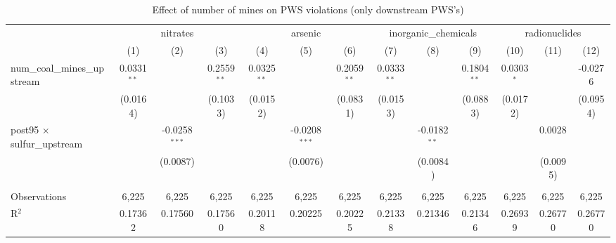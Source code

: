 
\begin{table}[htbp]
   \caption{\label{olsrf2sls_nummine_mine_vio_binary_1985to2005dwnstrm} Effect of number of mines on PWS violations (only downstream PWS's)}
   \bigskip
   \centering
   \begin{adjustbox}{width = \textwidth, center}
      \begin{tabular}{lcccccccccccc}
         \toprule
          & \multicolumn{3}{c}{nitrates} & \multicolumn{3}{c}{arsenic} & \multicolumn{3}{c}{inorganic\_chemicals} & \multicolumn{3}{c}{radionuclides}\\
                                                           & (1)           & (2)             & (3)           & (4)           & (5)             & (6)           & (7)           & (8)            & (9)           & (10)          & (11)                  & (12)\\  
         \midrule 
         num\_coal\_mines\_upstream                        & 0.0331$^{**}$ &                 & 0.2559$^{**}$ & 0.0325$^{**}$ &                 & 0.2059$^{**}$ & 0.0333$^{**}$ &                & 0.1804$^{**}$ & 0.0303$^{*}$  &                       & -0.0276\\   
                                                           & (0.0164)      &                 & (0.1033)      & (0.0152)      &                 & (0.0831)      & (0.0153)      &                & (0.0883)      & (0.0172)      &                       & (0.0954)\\   
         post95 $\times$ sulfur\_upstream                  &               & -0.0258$^{***}$ &               &               & -0.0208$^{***}$ &               &               & -0.0182$^{**}$ &               &               & 0.0028                &   \\   
                                                           &               & (0.0087)        &               &               & (0.0076)        &               &               & (0.0084)       &               &               & (0.0095)              &   \\   
          \\
         Observations                                      & 6,225         & 6,225           & 6,225         & 6,225         & 6,225           & 6,225         & 6,225         & 6,225          & 6,225         & 6,225         & 6,225                 & 6,225\\  
         R$^2$                                             & 0.17362       & 0.17560         & 0.17560       & 0.20118       & 0.20225         & 0.20225       & 0.21338       & 0.21346        & 0.21346       & 0.26939       & 0.26770               & 0.26770\\  

\end{tabular}
\end{adjustbox}
\end{table}

